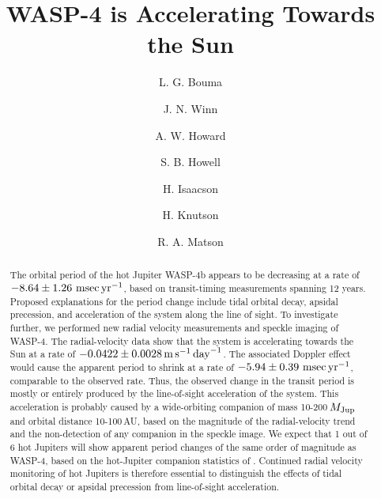 \documentclass[12pt,twocolumn,tighten]{aastex62}
\begin{document}

\title{WASP-4 is Accelerating Towards the Sun}


%
%
\author[0000-0002-0514-5538]{L. G. Bouma}
%
\author[0000-0002-4265-047X]{J. N. Winn}

%
%
\author[0000-0001-8638-0320]{A. W. Howard}
%
\author{S. B. Howell}
%
\author[0000-0002-0531-1073]{H. Isaacson}
%
\author{H. Knutson}
%
\author{R. A. Matson}
%

\begin{abstract}
  The orbital period of the hot Jupiter WASP-4b appears to be decreasing at
  a rate of $-8.64 \pm 1.26~{\rm msec}\,{\rm yr}^{-1}$,
  based on transit-timing measurements spanning 12 years.
  Proposed explanations for the period change include
  tidal orbital decay, apsidal precession, and acceleration of the system
  along the line of sight.
  To investigate further, we performed new radial velocity measurements and
  speckle imaging of WASP-4.
  The radial-velocity data show that the system is
  accelerating towards the Sun at a rate of
  $-0.0422\pm 0.0028\,{\rm m}\,{\rm s}^{-1}\,{\rm day}^{-1}$.
  The associated Doppler effect would cause
  the apparent period to shrink at a rate of
  $-5.94 \pm 0.39~{\rm msec}\,{\rm yr}^{-1}$, comparable
  to the observed rate.
  Thus, the observed change in the transit period is mostly
  or entirely produced by the line-of-sight acceleration of the system.
  This acceleration is probably caused by a wide-orbiting companion
  of mass 10-200$\,M_{\rm Jup}$ and orbital distance 10-100$\,$AU,
  based on the magnitude of the radial-velocity trend and the non-detection of any
  companion in the speckle image.  We expect that 1 out of 6 hot Jupiters
  will show apparent period changes of the same order of magnitude as WASP-4,
  based on the hot-Jupiter companion statistics of  
  \citet{knutson_friends_2014}. Continued radial velocity
  monitoring of hot Jupiters is therefore essential to distinguish
  the effects of tidal orbital decay or apsidal precession from line-of-sight acceleration.
\end{abstract}
\end{document}
